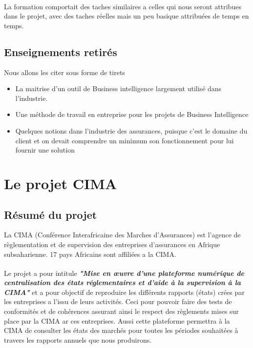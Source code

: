 \paragraph{}
La formation comportait des taches similaires a celles qui nous seront attribues dans le projet, avec des taches réelles mais un peu basique attribuées de temps en temps.



\subsection{Enseignements retirés}
Nous allons les citer sous forme de tirets
\begin{itemize}
    \item La maitrise d’un outil de Business intelligence largement utilisé dans l’industrie.
    \item Une méthode de travail en entreprise pour les projets de Business Intelligence
    \item Quelques notions dans l’industrie des assurances, puisque c’est le domaine du client et on devait comprendre un minimum son fonctionnement pour lui fournir une solution
\end{itemize}

\section{Le projet CIMA}

\subsection{Résumé du projet}
La CIMA (Conférence Interafricaine des Marches d’Assurances) est l’agence de règlementation et de supervision des entreprises d’assurances en Afrique subsaharienne. 17 pays Africains sont affiliées a la CIMA.
\paragraph{}
Le projet a pour intitule \textbf{\textit{"Mise en œuvre d’une plateforme numérique de centralisation des états réglementaires et d’aide à la supervision à la CIMA"}} et a pour objectif de reproduire les différents rapports (états) crées par les entreprises a l’issu de leurs activités. Ceci pour pouvoir faire des tests de conformités et de cohérences assurant ainsi le respect des règlements mises sur place par la CIMA ar ces entreprises. Aussi cette plateforme permettra à la CIMA de consulter les états des marchés pour toutes les périodes souhaitées à travers les rapports annuels que nous produirons.

